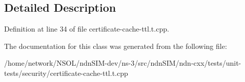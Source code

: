 \subsection{Detailed Description}


Definition at line 34 of file certificate-\/cache-\/ttl.\+t.\+cpp.



The documentation for this class was generated from the following file\+:\begin{DoxyCompactItemize}
\item 
/home/network/\+N\+S\+O\+L/ndn\+S\+I\+M-\/dev/ns-\/3/src/ndn\+S\+I\+M/ndn-\/cxx/tests/unit-\/tests/security/certificate-\/cache-\/ttl.\+t.\+cpp\end{DoxyCompactItemize}

